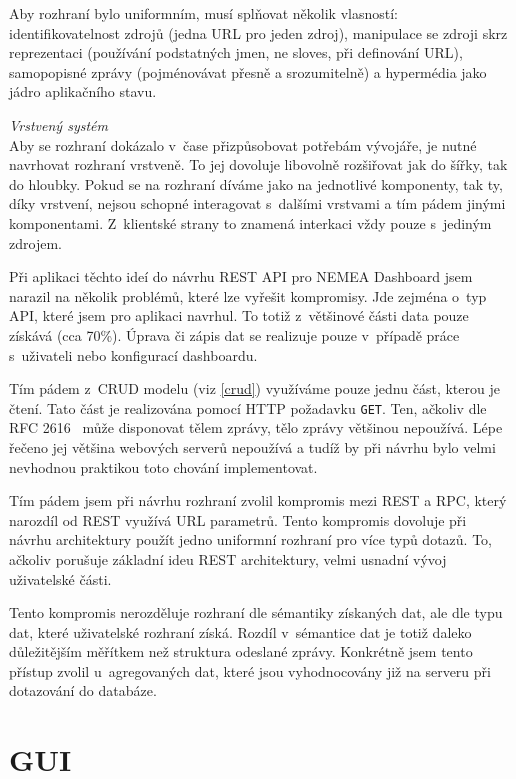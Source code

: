 \begin{description}
        Aby rozhraní bylo uniformním, musí splňovat několik vlasností: identifikovatelnost zdrojů (jedna URL pro jeden zdroj), manipulace se zdroji skrz reprezentaci (používání podstatných jmen, ne sloves, při definování URL), samopopisné zprávy (pojménovávat přesně a srozumitelně) a hypermédia jako jádro aplikačního stavu.

    \item \textit{Vrstvený systém} \\
        Aby se rozhraní dokázalo v~čase přizpůsobovat potřebám vývojáře, je nutné navrhovat rozhraní vrstveně. To jej dovoluje libovolně rozšiřovat jak do šířky, tak do hloubky. Pokud se na rozhraní díváme jako na jednotlivé komponenty, tak ty, díky vrstvení, nejsou schopné interagovat s~dalšími vrstvami a tím pádem jinými komponentami. Z~klientské strany to znamená interkaci vždy pouze s~jediným zdrojem.
        
\end{description}

Při aplikaci těchto ideí do návrhu REST API pro NEMEA Dashboard jsem narazil na několik problémů, které lze vyřešit kompromisy. Jde zejména o~typ API, které jsem pro aplikaci navrhul. To totiž z~většinové části data pouze získává (cca 70\%). Úprava či zápis dat se realizuje pouze v~případě práce s~uživateli nebo konfigurací dashboardu.

Tím pádem z~CRUD modelu (viz \ref{crud}) využíváme pouze jednu část, kterou je čtení. Tato část je realizována pomocí HTTP požadavku \texttt{GET}. Ten, ačkoliv dle RFC 2616~\cite{rfc:http} může disponovat tělem zprávy, tělo zprávy většinou nepoužívá. Lépe řečeno jej většina webových serverů nepoužívá a tudíž by při návrhu bylo velmi nevhodnou praktikou toto chování implementovat. 

Tím pádem jsem při návrhu rozhraní zvolil kompromis mezi REST a RPC, který narozdíl od REST využívá URL parametrů. Tento kompromis dovoluje při návrhu architektury použít jedno uniformní rozhraní pro více typů dotazů. To, ačkoliv porušuje základní ideu REST architektury, velmi usnadní vývoj uživatelské části.

Tento kompromis nerozděluje rozhraní dle sémantiky získaných dat, ale dle typu dat, které uživatelské rozhraní získá. Rozdíl v~sémantice dat je totiž daleko důležitějším měřítkem než struktura odeslané zprávy. Konkrétně jsem tento přístup zvolil u~agregovaných dat, které jsou vyhodnocovány již na serveru při dotazování do databáze.

\section{GUI}

